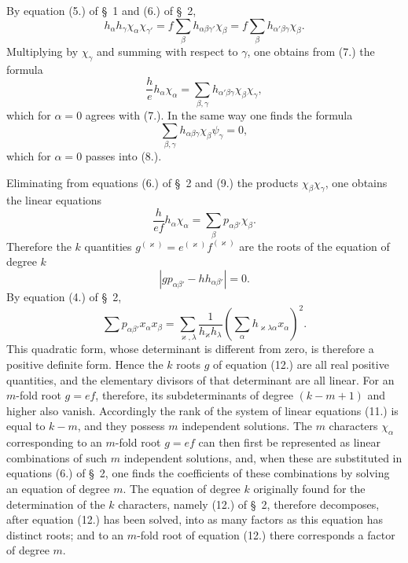 \documentclass[11pt]{article}
\begin{document}
By equation (5.) of \S~1 and (6.) of \S~2,
\[
h_\alpha h_\gamma\chi_\alpha\chi_{\gamma'}=f\sum_\beta h_{\alpha\beta\gamma'}\chi_\beta=f\sum_\beta h_{\alpha'\beta\gamma}\chi_\beta.
\]
Multiplying by $\chi_\gamma$ and summing with respect to $\gamma$, one obtains from (7.) the formula
\begin{equation*}\tag{9.}
\frac{h}{e}h_\alpha\chi_\alpha=\sum_{\beta,\gamma}h_{\alpha'\beta\gamma}\chi_\beta\chi_\gamma,
\end{equation*}
which for $\alpha=0$ agrees with (7.). In the same way one finds the formula
\begin{equation*}\tag{10.}
\sum_{\beta,\gamma}h_{\alpha\beta\gamma}\chi_\beta\psi_\gamma=0,
\end{equation*}
which for $\alpha=0$ passes into (8.).

Eliminating from equations (6.) of \S~2 and (9.) the products $\chi_\beta\chi_\gamma$, one obtains the linear equations
\begin{equation*}\tag{11.}
\frac{h}{ef}h_\alpha\chi_\alpha=\sum_\beta p_{\alpha\beta'}\chi_\beta.
\end{equation*}
Therefore the $k$ quantities $g^{(\varkappa)}=e^{(\varkappa)}f^{(\varkappa)}$ are the roots of the equation of degree $k$
\begin{equation*}\tag{12.}
\left|g p_{\alpha\beta'}-h h_{\alpha\beta'}\right|=0.
\end{equation*}
By equation (4.) of \S~2,
\begin{equation*}\tag{13.}
\sum p_{\alpha\beta'}x_\alpha x_\beta=\sum_{\varkappa,\lambda}\frac{1}{h_\varkappa h_\lambda}\left(\sum_\alpha h_{\varkappa\lambda\alpha}x_\alpha\right)^2.
\end{equation*}
This quadratic form, whose determinant is different from zero, is therefore a positive definite form. Hence the $k$ roots $g$ of equation (12.) are all real positive quantities, and the elementary divisors of that determinant are all linear. For an $m$-fold root $g=ef$, therefore, its subdeterminants of degree $(k-m+1)$ and higher also vanish. Accordingly the rank of the system of linear equations (11.) is equal to $k-m$, and they possess $m$ independent solutions. The $m$ characters $\chi_\alpha$ corresponding to an $m$-fold root $g=ef$ can then first be represented as linear combinations of such $m$ independent solutions, and, when these are substituted in equations (6.) of \S~2, one finds the coefficients of these combinations by solving an equation of degree $m$. The equation of degree $k$ originally found for the determination of the $k$ characters, namely (12.) of \S~2, therefore decomposes, after equation (12.) has been solved, into as many factors as this equation has distinct roots; and to an $m$-fold root of equation (12.) there corresponds a factor of degree $m$.
\end{document}
